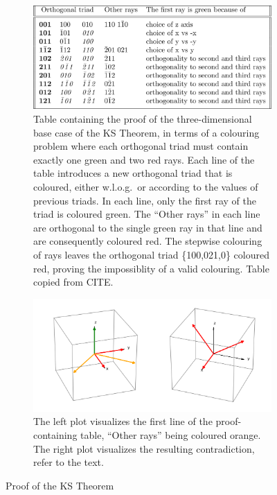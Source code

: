 \begin{figure}
\centering
\begin{subfigure}{\textwidth}
\centering
 \includegraphics[width=\textwidth]{images/perestable.png}
 \caption{Table containing the proof of the three-dimensional base case of the KS Theorem, in terms of a colouring problem where each orthogonal triad must contain exactly one green and two red rays. Each line of the table introduces a new orthogonal triad that is coloured, either w.l.o.g.\ or according to the values of previous triads. In each line, only the first ray of the triad is coloured green. The ``Other rays'' in each line are orthogonal to the single green ray in that line and are consequently coloured red. The stepwise colouring of rays leaves the orthogonal triad \{100,021,0\} coloured red, proving the impossiblity of a valid colouring. Table copied from CITE.}
 \label{fig:table}
\end{subfigure}
\hfill\break
\begin{subfigure}{\textwidth}
\centering
\includegraphics[width=\textwidth]{images/triads.png}
\caption{The left plot visualizes the first line of the proof-containing table, ``Other rays'' being coloured orange. The right plot visualizes the resulting contradiction, refer to the text.}
\label{fig:triads}
\end{subfigure}
\caption{Proof of the KS Theorem}
\label{fig:ksproof}
\end{figure}

